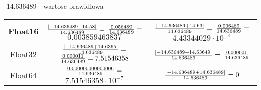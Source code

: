 \documentclass{article}[13pt]
\begin{document}
    -14.636489 - wartosc prawidlowa

    {\renewcommand{\arraystretch}{2}
    \begin{tabular}{| c | c | c |}
        \hline

        Float16 & ${|-14.636489+14.58|\over 14.636489}=$ ${0.056489\over14.636489}=$ $0.003859463837$ & ${|-14.636489 + 14.63|\over14.636489}=$ ${0.006489\over14.636489}=$ $4.43344029\cdot 10^{-4}$ \\

        \hline

        Float32 & ${|-14.636489 + 14.6365|\over14.636489}=$ ${0.000011\over14.636489}=7.51546358$ & ${|-14.636489 + 14.63649|\over14.636489}=$ ${0.000001\over14.636489}$ \\

        \hline

        Float64 & ${0.000000000000006\over14.636489}=$ $7.51546358\cdot10^{-7}$ & ${|-14.636489 + 14.636489|\over14.636489}=0$ \\

        \hline
    \end{tabular}}
\end{document}

